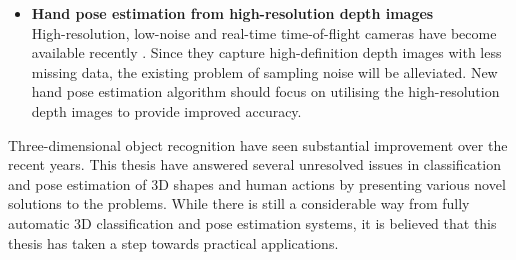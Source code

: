 \begin{itemize}
	\item \textbf{Hand pose estimation from high-resolution depth images}\\
	High-resolution, low-noise and real-time time-of-flight cameras have become available recently \cite{Nair2012}. Since they capture high-definition depth images with less missing data, the existing problem of sampling noise will be alleviated. New hand pose estimation algorithm should focus on utilising the high-resolution depth images to provide improved accuracy.  
\end{itemize}

Three-dimensional object recognition have seen substantial improvement over the recent years.
This thesis have answered several unresolved issues in classification and pose estimation of 3D shapes and human actions by presenting various novel solutions to the problems. While there is still a considerable way from fully automatic 3D classification and pose estimation systems, it is believed that this thesis has taken a step towards practical applications.  
